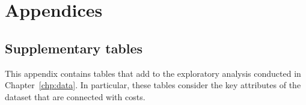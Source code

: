 \chapter*{Appendices}
\renewcommand{\thesection}{\Alph{section}}
\renewcommand{\thetable}{\Alph{section}.\arabic{table}}
\pagestyle{appendixstyle}

\appendix%
\section{Supplementary tables}\label{app:tables}

This appendix contains tables that add to the exploratory analysis conducted in
Chapter~\ref{chp:data}. In particular, these tables consider the key attributes
of the dataset that are connected with costs.

\begin{table}
        \centering
        \caption{%
            Spell-level statistics for each of the key attributes in the
            diabetic population (and non-diabetic population in parentheses)
        }\label{tab:diab_summary}
    \end{table}
